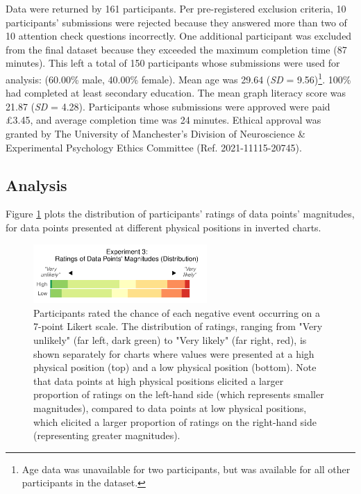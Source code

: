 \documentclass[journal]{vgtc}                %
\begin{document}
Data were returned by 161 participants. Per pre-registered exclusion
criteria, 10 participants' submissions were rejected because they
answered more than two of 10 attention check questions incorrectly. One
additional participant was excluded from the final dataset because they
exceeded the maximum completion time (87 minutes). This left a total of
150 participants whose submissions were used for analysis:
(60.00\% male, 40.00\% female).
Mean age was 29.64 (\emph{SD} =
9.56)\footnote{Age data was unavailable for two participants, but was available
  for all other participants in the dataset.}. 100\% had
completed at least secondary education. The mean graph literacy score
was 21.87 (\emph{SD} =
4.28). Participants whose submissions were
approved were paid £3.45, and average completion time was
24 minutes. Ethical approval was
granted by The University of Manchester's Division of Neuroscience \&
Experimental Psychology Ethics Committee (Ref. 2021-11115-20745).

\hypertarget{analysis-2}{%
\subsection{Analysis}\label{analysis-2}}

Figure \ref{fig:r3-c-plot} plots the distribution of participants'
ratings of data points' magnitudes, for data points presented at
different physical positions in inverted charts.

\begin{figure}
\includegraphics[width=250px]{position_magnitude_files/figure-latex/r3-c-plot-1} \caption{Participants rated the chance of each negative event occurring on a 7-point Likert scale. The distribution of ratings, ranging from "Very unlikely" (far left, dark green) to "Very likely" (far right, red), is shown separately for charts where values were presented at a high physical position (top) and a low physical position (bottom). Note that data points at high physical positions elicited a larger proportion of ratings on the left-hand side (which represents smaller magnitudes), compared to data points at low physical positions, which elicited a larger proportion of ratings on the right-hand side (representing greater magnitudes).}\label{fig:r3-c-plot}
\end{figure}
\end{document}
